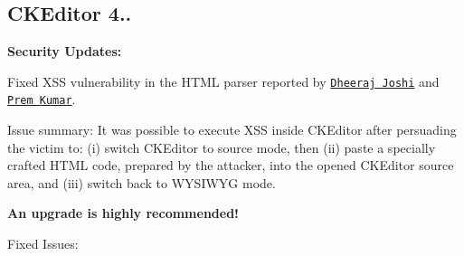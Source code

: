 \subsection*{C\+K\+Editor 4..}

{\bfseries Security Updates\+:}


\begin{DoxyItemize}
\item Fixed X\+SS vulnerability in the H\+T\+ML parser reported by \href{https://twitter.com/dheerajhere}{\tt Dheeraj Joshi} and \href{https://twitter.com/iAmPr3m}{\tt Prem Kumar}.

Issue summary\+: It was possible to execute X\+SS inside C\+K\+Editor after persuading the victim to\+: (i) switch C\+K\+Editor to source mode, then (ii) paste a specially crafted H\+T\+ML code, prepared by the attacker, into the opened C\+K\+Editor source area, and (iii) switch back to W\+Y\+S\+I\+W\+YG mode.
\end{DoxyItemize}

{\bfseries An upgrade is highly recommended!}

Fixed Issues\+:


